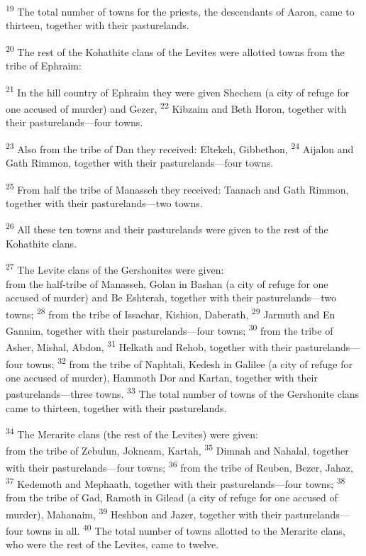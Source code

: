 \documentclass[12pt,twoside]{article}
\newcommand{\vs}[1]{\textsuperscript{#1}}
\begin{document}
\noindent \vs{19} The total number of towns for the priests, the descendants of Aaron, came to thirteen, together with their pasturelands. \vspace{0.4cm}

\noindent \vs{20} The rest of the Kohathite clans of the Levites were allotted towns from the tribe of Ephraim:

\begin{adjustwidth}{0.5cm}{0cm}
  \hspace{0.5cm}\vs{21} In the hill country of Ephraim they were given Shechem (a city of refuge for one accused of murder) and Gezer,
  \vs{22} Kibzaim and Beth Horon, together with their pasturelands---four towns.

  \vs{23} Also from the tribe of Dan they received: Eltekeh, Gibbethon,
  \vs{24} Aijalon and Gath Rimmon, together with their pasturelands---four towns.

  \vs{25} From half the tribe of Manasseh they received: Taanach and Gath Rimmon, together with their pasturelands---two towns.
\end{adjustwidth}

\noindent \vs{26} All these ten towns and their pasturelands were given to the rest of the Kohathite clans.\vspace{0.4cm}

\noindent \vs{27} The Levite clans of the Gershonites were given:\\
from the half-tribe of Manasseh, Golan in Bashan (a city of refuge for one accused of murder) and Be Eshterah, together with their pasturelands---two towns;
\vs{28} from the tribe of Issachar, Kishion, Daberath,
\vs{29} Jarmuth and En Gannim, together with their pasturelands---four towns;
\vs{30} from the tribe of Asher, Mishal, Abdon,
\vs{31} Helkath and Rehob, together with their pasturelands---four towns;
\vs{32} from the tribe of Naphtali, Kedesh in Galilee (a city of refuge for one accused of murder), Hammoth Dor and Kartan, together with their pasturelands---three towns.
\vs{33} The total number of towns of the Gershonite clans came to thirteen, together with their pasturelands.\vspace{0.4cm}

\noindent \vs{34} The Merarite clans (the rest of the Levites) were given:\\
from the tribe of Zebulun, Jokneam, Kartah,
\vs{35} Dimnah and Nahalal, together with their pasturelands---four towns;
\vs{36} from the tribe of Reuben, Bezer, Jahaz,
\vs{37} Kedemoth and Mephaath, together with their pasturelands---four towns;
\vs{38} from the tribe of Gad, Ramoth in Gilead (a city of refuge for one accused of murder), Mahanaim,
\vs{39} Heshbon and Jazer, together with their pasturelands---four towns in all.
\vs{40} The total number of towns allotted to the Merarite clans, who were the rest of the Levites, came to twelve.
\end{document}
